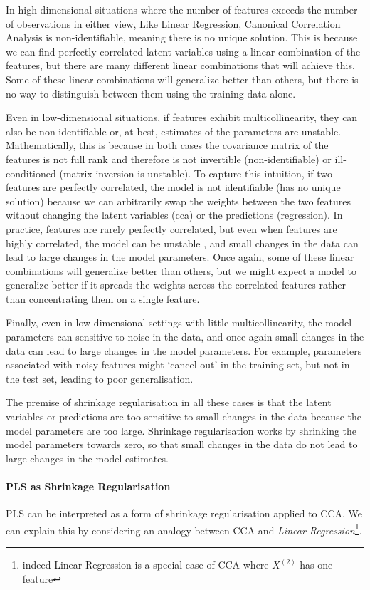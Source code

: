 In high-dimensional situations where the number of features exceeds the number of observations in either view, Like Linear Regression, Canonical Correlation Analysis is non-identifiable, meaning there is no unique solution.
This is because we can find perfectly correlated latent variables using a linear combination of the features, but there are many different linear combinations that will achieve this.
Some of these linear combinations will generalize better than others, but there is no way to distinguish between them using the training data alone.

Even in low-dimensional situations, if features exhibit multicollinearity, they can also be non-identifiable or, at best, estimates of the parameters are unstable.
Mathematically, this is because in both cases the covariance matrix of the features is not full rank and therefore is not invertible (non-identifiable) or ill-conditioned (matrix inversion is unstable).
To capture this intuition, if two features are perfectly correlated, the model is not identifiable (has no unique solution) because we can arbitrarily swap the \gls{weights} between the two features without changing the latent variables (\acrshort{cca}) or the predictions (regression).
In practice, features are rarely perfectly correlated, but even when features are highly correlated, the model can be unstable \citep{mihalik2020multiple}, and small changes in the data can lead to large changes in the model parameters.
Once again, some of these linear combinations will generalize better than others, but we might expect a model to generalize better if it spreads the \gls{weights} across the correlated features rather than concentrating them on a single feature.

Finally, even in low-dimensional settings with little multicollinearity, the model parameters can sensitive to noise in the data, and once again small changes in the data can lead to large changes in the model parameters.
For example, parameters associated with noisy features might `cancel out' in the training set, but not in the test set, leading to poor generalisation.

The premise of shrinkage regularisation in all these cases is that the latent variables or predictions are too sensitive to small changes in the data because the model parameters are too large.
Shrinkage regularisation works by shrinking the model parameters towards zero, so that small changes in the data do not lead to large changes in the model estimates.

\paragraph{PLS as Shrinkage Regularisation} PLS can be interpreted as a form of shrinkage regularisation applied to CCA. We can explain this by considering an analogy between CCA and \textit{Linear Regression}\footnote{indeed Linear Regression is a special case of CCA where \(X^{(2)}\) has one feature}.

